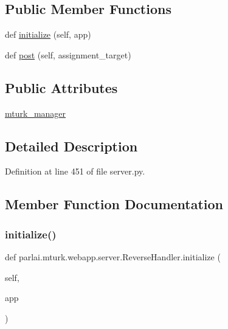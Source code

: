 \subsection*{Public Member Functions}
\begin{DoxyCompactItemize}
\item 
def \hyperlink{classparlai_1_1mturk_1_1webapp_1_1server_1_1ReverseHandler_a84a97cad4ff974d2765f02610941016c}{initialize} (self, app)
\item 
def \hyperlink{classparlai_1_1mturk_1_1webapp_1_1server_1_1ReverseHandler_a68457ba85cc4853cd5e1be1cbc05ca22}{post} (self, assignment\+\_\+target)
\end{DoxyCompactItemize}
\subsection*{Public Attributes}
\begin{DoxyCompactItemize}
\item 
\hyperlink{classparlai_1_1mturk_1_1webapp_1_1server_1_1ReverseHandler_a60664e4d71da9169afe68bd7b4f8a801}{mturk\+\_\+manager}
\end{DoxyCompactItemize}


\subsection{Detailed Description}


Definition at line 451 of file server.\+py.



\subsection{Member Function Documentation}
\mbox{\label{classparlai_1_1mturk_1_1webapp_1_1server_1_1ReverseHandler_a84a97cad4ff974d2765f02610941016c}} 
\subsubsection{\texorpdfstring{initialize()}{initialize()}}
{\footnotesize\ttfamily def parlai.\+mturk.\+webapp.\+server.\+Reverse\+Handler.\+initialize (\begin{DoxyParamCaption}\item[{}]{self,  }\item[{}]{app }\end{DoxyParamCaption})}



